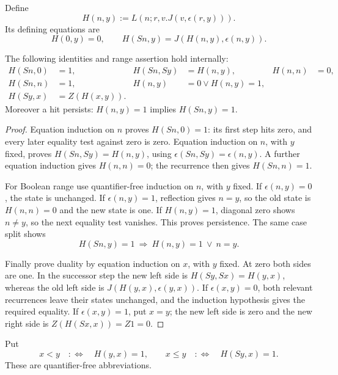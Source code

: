 Define
\[
 H(n,y):=L(n;r,v.J(v,\epsilon(r,y))).
\]
Its defining equations are
\[
 H(0,y)=0,\qquad H(Sn,y)=J(H(n,y),\epsilon(n,y)).
 \tag{H}\label{eq:internal-hit-recursion}
\]

\begin{lemma}
\label{lem:internal-hit}
The following identities and range assertion hold internally:
\begin{align*}
 H(Sn,0)&=1,& H(Sn,Sy)&=H(n,y),& H(n,n)&=0,\\
 H(Sn,n)&=1,& H(n,y)&=0\lor H(n,y)=1,\\
 H(Sy,x)&=Z(H(x,y)).
\end{align*}
Moreover a hit persists: $H(n,y)=1$ implies $H(Sn,y)=1$.
\end{lemma}
\begin{proof}
Equation induction on $n$ proves $H(Sn,0)=1$: its first step hits zero,
and every later equality test against zero is zero.  Equation induction
on $n$, with $y$ fixed, proves $H(Sn,Sy)=H(n,y)$, using
$\epsilon(Sn,Sy)=\epsilon(n,y)$.  A further equation induction gives
$H(n,n)=0$; the recurrence then gives $H(Sn,n)=1$.

For Boolean range use quantifier-free induction on $n$, with $y$ fixed.
If $\epsilon(n,y)=0$, the state is unchanged.  If $\epsilon(n,y)=1$, reflection
gives $n=y$, so the old state is $H(n,n)=0$ and the new state is one.
If $H(n,y)=1$, diagonal zero shows $n\ne y$, so the next equality test
vanishes.  This proves persistence.  The same case split shows
\[
 H(Sn,y)=1\ \Longrightarrow\ H(n,y)=1\ \lor\ n=y.
 \tag{New hit}\label{eq:internal-new-hit}
\]

Finally prove duality by equation induction on $x$, with $y$ fixed.
At zero both sides are one.  In the successor step the new left side is
$H(Sy,Sx)=H(y,x)$, whereas the old left side is
$J(H(y,x),\epsilon(y,x))$.  If $\epsilon(x,y)=0$, both relevant recurrences
leave their states unchanged, and the induction hypothesis gives the
required equality.  If $\epsilon(x,y)=1$, put $x=y$; the new left side is
zero and the new right side is $Z(H(Sx,x))=Z1=0$.
\end{proof}

Put
\[
 x<y\quad:\!\Longleftrightarrow\quad H(y,x)=1,
 \qquad
 x\le y\quad:\!\Longleftrightarrow\quad H(Sy,x)=1.
 \tag{Order}\label{eq:internal-order}
\]
These are quantifier-free abbreviations.

